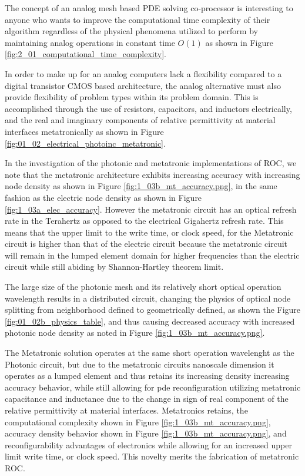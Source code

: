\par The concept of an analog mesh based PDE solving co-processor is interesting to anyone who wants to improve the computational time complexity of their algorithm regardless of the physical phenomena utilized to perform by maintaining analog operations in constant time $O(1)$ as shown in Figure \ref{fig:2_01_computational_time_complexity}.
    
\par In order to make up for an analog computers lack a flexibility compared to a digital transistor CMOS based architecture, the analog alternative must also provide flexibility of problem types within its problem domain. This is accomplished through the use of resistors, capacitors, and inductors electrically, and the real and imaginary components of relative permittivity at material interfaces metatronically as shown in Figure \ref{fig:01_02_electrical_photoinc_metatronic}.

\par In the investigation of the photonic and metatronic implementations of ROC, we note that the metatronic architecture exhibits increasing accuracy with increasing node density as shown in Figure \ref{fig:1_03b_mt_accuracy.png}, in the same fashion as the electric node density as shown in Figure \ref{fig:1_03a_elec_accuracy}. However the metatronic circuit has an optical refresh rate in the Terahertz as opposed to the electrical Gigahertz refresh rate. This means that the upper limit to the write time, or clock speed, for the Metatronic circuit is higher than that of the electric circuit because the metatronic circuit will remain in the lumped element domain for higher frequencies than the electric circuit while still abiding by Shannon-Hartley theorem limit. 
    
\par The large size of the photonic mesh and its relatively short optical operation wavelength results in a distributed circuit, changing the physics of optical node splitting from neighborhood defined to geometrically defined, as shown the Figure \ref{fig:01_02b_physics_table}, and thus causing decreased accuracy with increased photonic node density as noted in Figure \ref{fig:1_03b_mt_accuracy.png}.
    
\par The Metatronic solution operates at the same short operation wavelenght as the Photonic circuit, but due to the metatronic circuits nanoscale dimension it operates as a lumped element and thus retains its increasing density increasing accuracy behavior, while still allowing for pde reconfiguration utilizing metatronic capacitance and inductance due to the change in sign of real component of the relative permittivity at material interfaces. Metatronics retains, the computational complexity shown in Figure \ref{fig:1_03b_mt_accuracy.png}, accuracy density behavior shown in Figure \ref{fig:1_03b_mt_accuracy.png}, and reconfigurability advantages of electronics while allowing for an increased upper limit write time, or clock speed. This novelty merits the fabrication of metatronic ROC.


